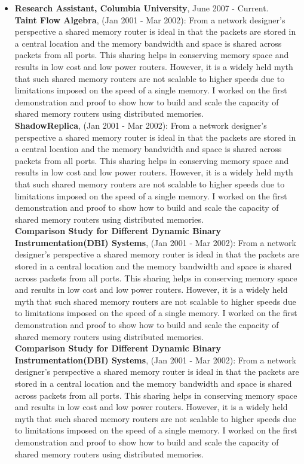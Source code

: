 \documentclass[10pt,a4]{article}
\begin{document}
\begin{small}
\begin{itemize}
\vspace{0.1cm}
\item  {\bf Research Assistant, Columbia University}, June 2007 - Current. \\
%
  {\bf Taint Flow Algebra}, (Jan 2001 - Mar 2002): From a network designer's
  perspective a shared memory router is ideal in that the packets are stored in
  a central location and the memory bandwidth and space is shared across packets
  from all ports. This sharing helps in conserving memory space and results in
  low cost and low power routers. However, it is a widely held myth that such
  shared memory routers are not scalable to higher speeds due to limitations
  imposed on the speed of a single memory. I worked on the first demonstration
  and proof to show how to build and scale the capacity of shared memory routers
  using distributed memories. \\
%
  {\bf ShadowReplica}, (Jan 2001 - Mar 2002): From a network designer's
  perspective a shared memory router is ideal in that the packets are stored in
  a central location and the memory bandwidth and space is shared across packets
  from all ports. This sharing helps in conserving memory space and results in
  low cost and low power routers. However, it is a widely held myth that such
  shared memory routers are not scalable to higher speeds due to limitations
  imposed on the speed of a single memory. I worked on the first demonstration
  and proof to show how to build and scale the capacity of shared memory routers
  using distributed memories. \\
%
  {\bf Comparison Study for Different Dynamic Binary Instrumentation(DBI)
    Systems}, (Jan 2001 - Mar 2002): From a network designer's perspective a
  shared memory router is ideal in that the packets are stored in a central
  location and the memory bandwidth and space is shared across packets from all
  ports. This sharing helps in conserving memory space and results in low cost
  and low power routers. However, it is a widely held myth that such shared
  memory routers are not scalable to higher speeds due to limitations imposed on
  the speed of a single memory. I worked on the first demonstration and proof to
  show how to build and scale the capacity of shared memory routers using
  distributed memories.\\
%
  {\bf Comparison Study for Different Dynamic Binary Instrumentation(DBI)
    Systems}, (Jan 2001 - Mar 2002): From a network designer's perspective a
  shared memory router is ideal in that the packets are stored in a central
  location and the memory bandwidth and space is shared across packets from all
  ports. This sharing helps in conserving memory space and results in low cost
  and low power routers. However, it is a widely held myth that such shared
  memory routers are not scalable to higher speeds due to limitations imposed on
  the speed of a single memory. I worked on the first demonstration and proof to
  show how to build and scale the capacity of shared memory routers using
  distributed memories.


\end{itemize}
\end{small}
\end{document}
